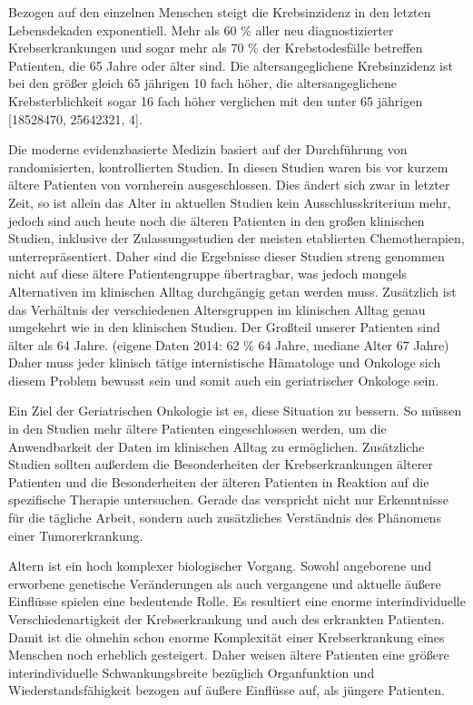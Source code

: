 Bezogen auf den einzelnen Menschen steigt die Krebsinzidenz in den
letzten Lebensdekaden exponentiell. Mehr als 60 \% aller neu
diagnostizierter Krebserkrankungen und sogar mehr als 70 \% der
Krebstodesfälle betreffen Patienten, die 65 Jahre oder älter sind. Die
altersangeglichene Krebsinzidenz ist bei den größer gleich 65 jährigen
10 fach höher, die altersangeglichene Krebsterblichkeit sogar 16 fach
höher verglichen mit den unter 65 jährigen [18528470, 25642321, 4].

Die moderne evidenzbasierte Medizin basiert auf der Durchführung von
randomisierten, kontrollierten Studien. In diesen Studien waren bis
vor kurzem ältere Patienten von vornherein ausgeschlossen. Dies ändert
sich zwar in letzter Zeit, so ist allein das Alter in aktuellen
Studien kein Ausschlusskriterium mehr, jedoch sind auch heute noch die
älteren Patienten in den großen klinischen Studien, inklusive der
Zulassungsstudien der meisten etablierten Chemotherapien,
unterrepräsentiert. Daher sind die Ergebnisse dieser Studien streng
genommen nicht auf diese ältere Patientengruppe übertragbar, was
jedoch mangels Alternativen im klinischen Alltag durchgängig getan
werden muss. Zusätzlich ist das Verhältnis der verschiedenen
Altersgruppen im klinischen Alltag genau umgekehrt wie in den
klinischen Studien. Der Großteil unserer Patienten sind älter als 64
Jahre. (eigene Daten 2014: 62 \% 64 Jahre, mediane Alter 67 Jahre)
Daher muss jeder klinisch tätige internistische Hämatologe und
Onkologe sich diesem Problem bewusst sein und somit auch ein
geriatrischer Onkologe sein.

Ein Ziel der Geriatrischen Onkologie ist es, diese Situation zu
bessern. So müssen in den Studien mehr ältere Patienten eingeschlossen
werden, um die Anwendbarkeit der Daten im klinischen Alltag zu
ermöglichen. Zusätzliche Studien sollten außerdem die Besonderheiten
der Krebserkrankungen älterer Patienten und die Besonderheiten der
älteren Patienten in Reaktion auf die spezifische Therapie
untersuchen. Gerade das verspricht nicht nur Erkenntnisse für die
tägliche Arbeit, sondern auch zusätzliches Verständnis des Phänomens
einer Tumorerkrankung.

Altern ist ein hoch komplexer biologischer Vorgang. Sowohl angeborene
und erworbene genetische Veränderungen als auch vergangene und
aktuelle äußere Einflüsse spielen eine bedeutende Rolle. Es resultiert
eine enorme interindividuelle Verschiedenartigkeit der Krebserkrankung
und auch des erkrankten Patienten. Damit ist die ohnehin schon enorme
Komplexität einer Krebserkrankung eines Menschen noch erheblich
gesteigert. Daher weisen ältere Patienten eine größere
interindividuelle Schwankungsbreite bezüglich Organfunktion und
Wiederstandsfähigkeit bezogen auf äußere Einflüsse auf, als jüngere
Patienten.

